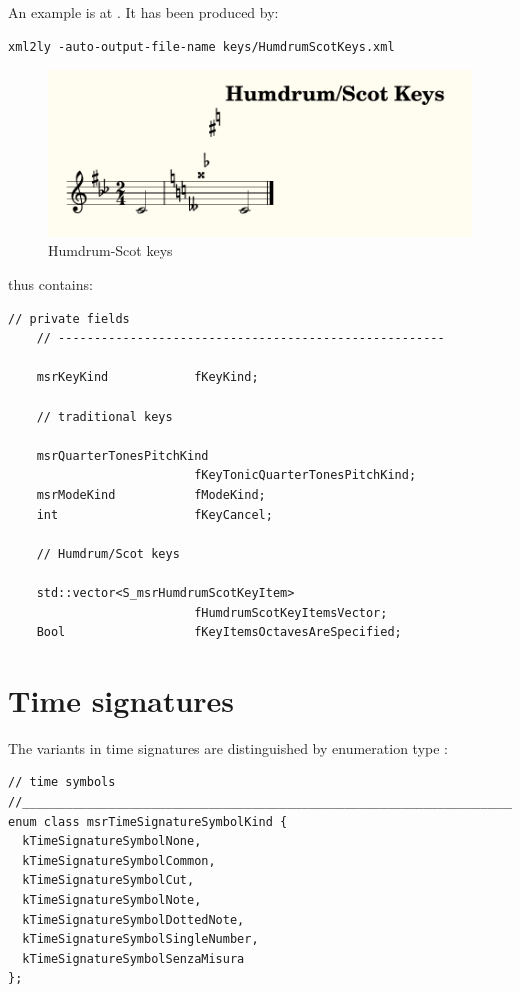 An example is at . It has been produced by:
\begin{lstlisting}[language=Terminal]
xml2ly -auto-output-file-name keys/HumdrumScotKeys.xml
\end{lstlisting}

\begin{figure}[htbp]
\begin{center}
\includegraphics{../graphics/HumdrumScotKeys.png}

\caption{Humdrum-Scot keys}
\label{Humdrum-Scot keys}
\end{center}
\end{figure}

 thus contains:
\begin{lstlisting}[language=CPlusPlus]
    // private fields
    // ------------------------------------------------------

    msrKeyKind            fKeyKind;

    // traditional keys

    msrQuarterTonesPitchKind
                          fKeyTonicQuarterTonesPitchKind;
    msrModeKind           fModeKind;
    int                   fKeyCancel;

    // Humdrum/Scot keys

    std::vector<S_msrHumdrumScotKeyItem>
                          fHumdrumScotKeyItemsVector;
    Bool                  fKeyItemsOctavesAreSpecified;
\end{lstlisting}


\section{Time signatures}\label{Time signatures}

The variants in time signatures are distinguished by enumeration type :
\begin{lstlisting}[language=CPlusPlus]
// time symbols
//______________________________________________________________________________
enum class msrTimeSignatureSymbolKind {
  kTimeSignatureSymbolNone,
  kTimeSignatureSymbolCommon,
  kTimeSignatureSymbolCut,
  kTimeSignatureSymbolNote,
  kTimeSignatureSymbolDottedNote,
  kTimeSignatureSymbolSingleNumber,
  kTimeSignatureSymbolSenzaMisura
};
\end{lstlisting}

